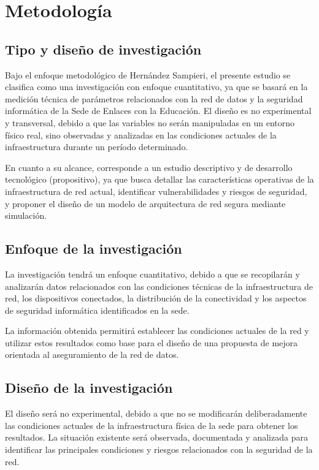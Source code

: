 \section{Metodología}

\subsection{Tipo y diseño de investigación}

Bajo el enfoque metodológico de Hernández Sampieri, el presente estudio se clasifica como una investigación con enfoque cuantitativo, ya que se basará en la medición técnica de parámetros relacionados con la red de datos y la seguridad informática de la Sede de Enlaces con la Educación. El diseño es no experimental y transversal, debido a que las variables no serán manipuladas en un entorno físico real, sino observadas y analizadas en las condiciones actuales de la infraestructura durante un período determinado.

En cuanto a su alcance, corresponde a un estudio descriptivo y de desarrollo tecnológico (propositivo), ya que busca detallar las características operativas de la infraestructura de red actual, identificar vulnerabilidades y riesgos de seguridad, y proponer el diseño de un modelo de arquitectura de red segura mediante simulación.

\subsection{Enfoque de la investigación}

La investigación tendrá un enfoque cuantitativo, debido a que se recopilarán y analizarán datos relacionados con las condiciones técnicas de la infraestructura de red, los dispositivos conectados, la distribución de la conectividad y los aspectos de seguridad informática identificados en la sede.

La información obtenida permitirá establecer las condiciones actuales de la red y utilizar estos resultados como base para el diseño de una propuesta de mejora orientada al aseguramiento de la red de datos.

\subsection{Diseño de la investigación}

El diseño será no experimental, debido a que no se modificarán deliberadamente las condiciones actuales de la infraestructura física de la sede para obtener los resultados. La situación existente será observada, documentada y analizada para identificar las principales condiciones y riesgos relacionados con la seguridad de la red.

